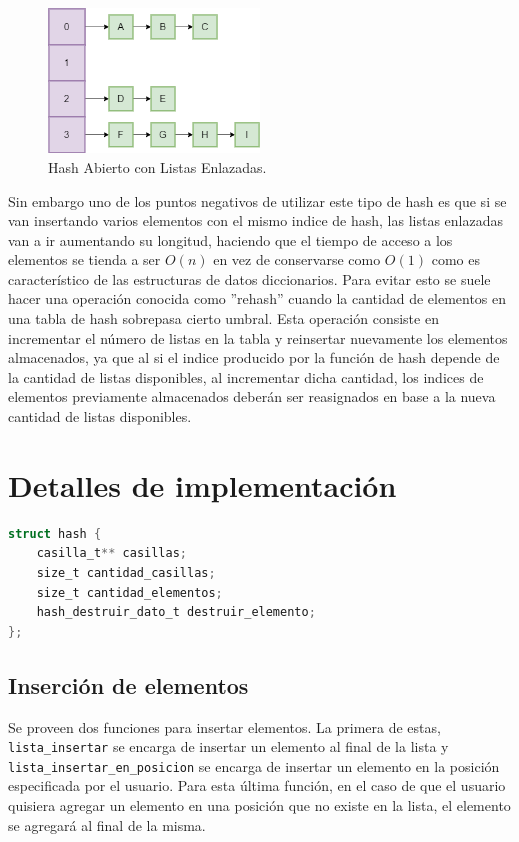 \documentclass[titlepage,a4paper]{article}
\begin{document}
\begin{figure}[H]
\centering
\includegraphics[width=0.5\textwidth]{2_hash_abierto.png}
\caption{\label{fig:seq02}Hash Abierto con Listas Enlazadas.}
\end{figure}

Sin embargo uno de los puntos negativos de utilizar este tipo de hash es que
si se van insertando varios elementos con el mismo indice de hash, las listas
enlazadas van a ir aumentando su longitud, haciendo que el tiempo de acceso a
los elementos se tienda a ser $O(n)$ en vez de conservarse como $O(1)$ como
es característico de las estructuras de datos diccionarios. Para evitar esto se
suele hacer una operación conocida como ''rehash'' cuando la cantidad de
elementos en una tabla de hash sobrepasa cierto umbral. Esta operación consiste
en incrementar el número de listas en la tabla y reinsertar nuevamente los
elementos almacenados, ya que al si el indice producido por la función de hash
depende de la cantidad de listas disponibles, al incrementar dicha cantidad, los
indices de elementos previamente almacenados deberán ser reasignados en base a
la nueva cantidad de listas disponibles.



\section{Detalles de implementación}\label{sec:implementacion}

\begin{lstlisting}[language=C]
struct hash {
	casilla_t** casillas;
	size_t cantidad_casillas;
	size_t cantidad_elementos;
	hash_destruir_dato_t destruir_elemento;
};
\end{lstlisting}

\subsection{Inserción de elementos}
Se proveen dos funciones para insertar elementos. La primera de estas, \lstinline{lista_insertar} se encarga de insertar un elemento al final de la lista y \lstinline{lista_insertar_en_posicion} se encarga de insertar un elemento en la posición especificada por el usuario. Para esta última función, en el caso de que el usuario quisiera agregar un elemento en una posición que no existe en la lista, el elemento se agregará al final de la misma.
\end{document}
